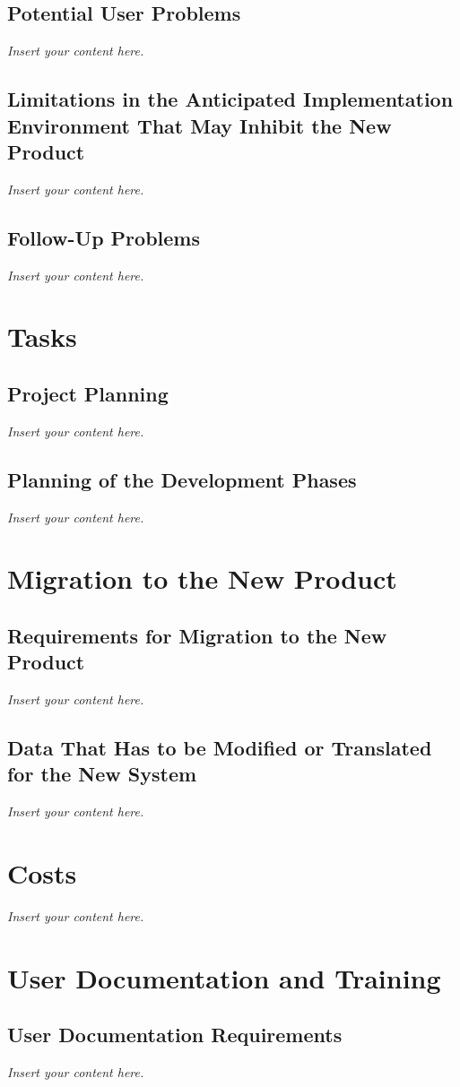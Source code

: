 \documentclass[12pt]{article}
\newcommand{\lips}{\textit{Insert your content here.}}
\begin{document}
\subsection{Potential User Problems}
\lips
\subsection{Limitations in the Anticipated Implementation Environment That May
Inhibit the New Product}
\lips
\subsection{Follow-Up Problems}
\lips

\section{Tasks}
\subsection{Project Planning}
\lips
\subsection{Planning of the Development Phases}
\lips

\section{Migration to the New Product}
\subsection{Requirements for Migration to the New Product}
\lips
\subsection{Data That Has to be Modified or Translated for the New System}
\lips

\section{Costs}
\lips
\section{User Documentation and Training}
\subsection{User Documentation Requirements}
\lips
\end{document}
